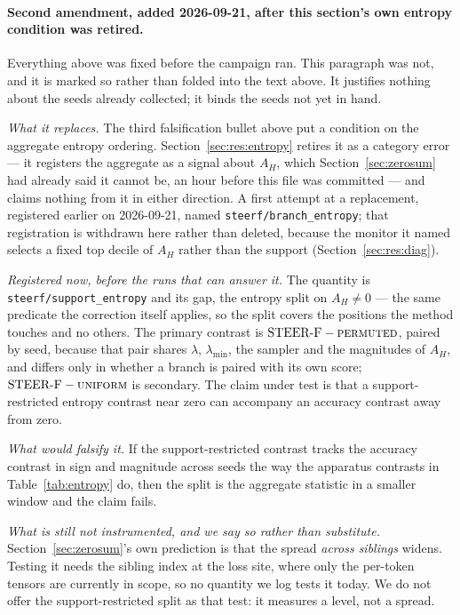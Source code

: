 \documentclass[11pt]{article}
\newcommand{\AH}{A_{H}}
\begin{document}
\paragraph{Second amendment, added 2026-09-21, after this section's own entropy
condition was retired.} Everything above was fixed before the campaign ran. This
paragraph was not, and it is marked so rather than folded into the text above. It
justifies nothing about the seeds already collected; it binds the seeds not yet in
hand.

\emph{What it replaces.} The third falsification bullet above put a condition on the
aggregate entropy ordering. Section~\ref{sec:res:entropy} retires it as a category
error --- it registers the aggregate as a signal about $\AH$, which
Section~\ref{sec:zerosum} had already said it cannot be, an hour before this file was
committed --- and claims nothing from it in either direction. A first attempt at a
replacement, registered earlier on 2026-09-21, named
\texttt{steerf/branch\_entropy}; that registration is withdrawn here rather than
deleted, because the monitor it named selects a fixed top decile of $\AH$ rather than
the support (Section~\ref{sec:res:diag}).

\emph{Registered now, before the runs that can answer it.} The quantity is
\texttt{steerf/support\_entropy} and its gap, the entropy split on $\AH \ne 0$ ---
the same predicate the correction itself applies, so the split covers the positions
the method touches and no others. The primary contrast is
$\text{STEER-F} - \textsc{permuted}$, paired by seed, because that pair shares
$\lambda$, $\lambda_{\min}$, the sampler and the magnitudes of $\AH$, and differs
only in whether a branch is paired with its own score;
$\text{STEER-F} - \textsc{uniform}$ is secondary. The claim under test is that a
support-restricted entropy contrast near zero can accompany an accuracy contrast away
from zero.

\emph{What would falsify it.} If the support-restricted contrast tracks the accuracy
contrast in sign and magnitude across seeds the way the apparatus contrasts in
Table~\ref{tab:entropy} do, then the split is the aggregate statistic in a smaller
window and the claim fails.

\emph{What is still not instrumented, and we say so rather than substitute.}
Section~\ref{sec:zerosum}'s own prediction is that the spread \emph{across siblings}
widens. Testing it needs the sibling index at the loss site, where only the
per-token tensors are currently in scope, so no quantity we log tests it today. We
do not offer the support-restricted split as that test: it measures a level, not a
spread.
\end{document}
